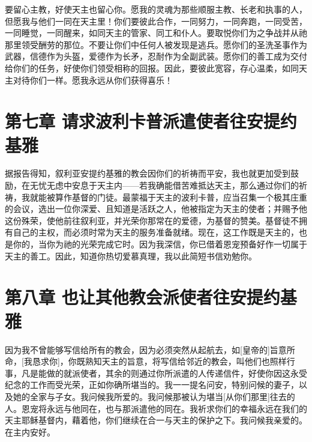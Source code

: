 要留心主教，好使天主也留心你。愿我的灵魂为那些顺服主教、长老和执事的人，但愿我与他们一同在天主里！你们要彼此合作，一同努力，一同奔跑，一同受苦，一同睡觉，一同醒来，如同天主的管家、同工和仆人。要取悦你们为之争战并从祂那里领受酬劳的那位。不要让你们中任何人被发现是逃兵。愿你们的圣洗圣事作为武器，信德作为头盔，爱德作为长矛，忍耐作为全副武装。愿你们的善工成为交付给你们的任务，好使你们领受相称的回报。因此，要彼此宽容，存心温柔，如同天主对待你们一样。愿我永远从你们获得喜乐！\par


\section{第七章 请求波利卡普派遣使者往安提约基雅}

据报告得知，叙利亚安提约基雅的教会因你们的祈祷而平安，我也就更加受到鼓励，在无忧无虑中安息于天主内——若我确能借苦难抵达天主，那么通过你们的祈祷，我就能被算作基督的门徒。最蒙福于天主的波利卡普，应当召集一个极其庄重的会议，选出一位你深爱、且知道是活跃之人，他被指定为天主的使者；并赐予他这份殊荣，使他前往叙利亚，并光荣你那常在的爱德，为基督的赞美。基督徒不拥有自己的主权，而必须时常为天主的服务准备就绪。现在，这工作既是天主的，也是你的，当你为祂的光荣完成它时。因为我深信，你已借着恩宠预备好作一切属于天主的善工。因此，知道你热切爱慕真理，我以此简短书信劝勉你。\par


\section{第八章 也让其他教会派使者往安提约基雅}

因为我不曾能够写信给所有的教会，因为必须突然从起航去，如[皇帝的]旨意所命，[我恳求你]，你既熟知天主的旨意，将写信给邻近的教会，叫他们也照样行事，凡是能做的就派使者，其余的则通过你所派遣的人传递信件，好使你因这永受纪念的工作而受光荣，正如你确所堪当的。我一一提名问安，特别问候的妻子，以及她的全家与子女。我问候我所爱的。我问候那被认为堪当[从你们那里]往去的人。恩宠将永远与他同在，也与那派遣他的同在。我祈求你们的幸福永远在我们的天主耶稣基督内，藉着他，你们继续在合一与天主的保护之下。我问候我亲爱的。在主内安好。\par

